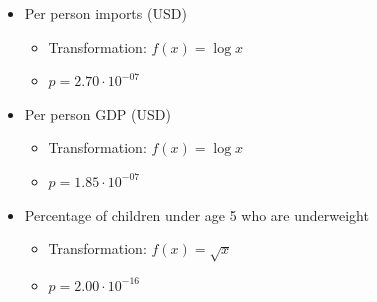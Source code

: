 \documentclass[oneside,12pt]{report}
\begin{document}
\begin{itemize}
\item Per person imports (USD)
	\begin{itemize}
	\item Transformation: \begin{math}f(x) =\log{x}\end{math}
	\item \begin{math}p=2.70\cdot10^{-07}\end{math}
	\end{itemize}
\item Per person GDP (USD)
	\begin{itemize}
	\item Transformation: \begin{math}f(x) = \log{x}\end{math}
	\item \begin{math}p=1.85\cdot10^{-07}\end{math}
	\end{itemize}
\item Percentage of children under age 5 who are underweight
	\begin{itemize}
	\item Transformation: \begin{math}f(x) = \sqrt{x}\end{math}
	\item \begin{math}p=2.00\cdot10^{-16}\end{math}
	\end{itemize}
\end{itemize}
\end{document}
